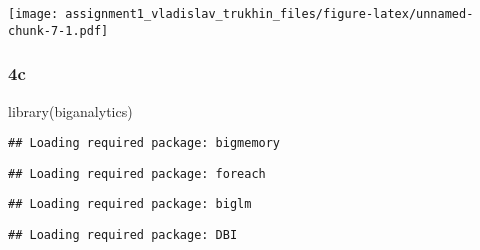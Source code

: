 \documentclass[
]{article}
\newenvironment{Shaded}{\begin{snugshade}}{\end{snugshade}}
\newcommand{\AttributeTok}[1]{\textcolor[rgb]{0.77,0.63,0.00}{#1}}
\newcommand{\CommentTok}[1]{\textcolor[rgb]{0.56,0.35,0.01}{\textit{#1}}}
\newcommand{\ControlFlowTok}[1]{\textcolor[rgb]{0.13,0.29,0.53}{\textbf{#1}}}
\newcommand{\FunctionTok}[1]{\textcolor[rgb]{0.00,0.00,0.00}{#1}}
\newcommand{\NormalTok}[1]{#1}
\newcommand{\OtherTok}[1]{\textcolor[rgb]{0.56,0.35,0.01}{#1}}
\newcommand{\SpecialCharTok}[1]{\textcolor[rgb]{0.00,0.00,0.00}{#1}}
\newcommand{\StringTok}[1]{\textcolor[rgb]{0.31,0.60,0.02}{#1}}
\begin{document}
\begin{Shaded}
\end{Shaded}

\texttt{[image: assignment1\_vladislav\_trukhin\_files/figure-latex/unnamed-chunk-7-1.pdf]}

\hypertarget{c-2}{%
\subsubsection{4c}\label{c-2}}

\begin{Shaded}
\begin{Highlighting}[]
\FunctionTok{library}\NormalTok{(biganalytics)}
\end{Highlighting}
\end{Shaded}

\begin{verbatim}
## Loading required package: bigmemory
\end{verbatim}

\begin{verbatim}
## Loading required package: foreach
\end{verbatim}

\begin{verbatim}
## Loading required package: biglm
\end{verbatim}

\begin{verbatim}
## Loading required package: DBI
\end{verbatim}
\end{document}
